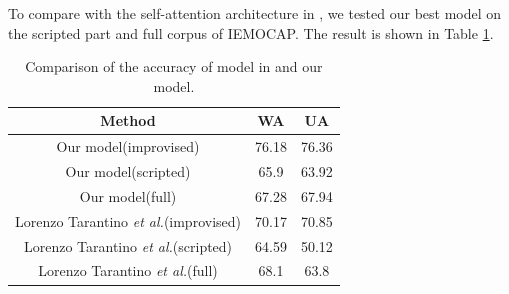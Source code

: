 \documentclass[10pt, conference, compsocconf]{IEEEtran}
\begin{document}
To compare with the self-attention architecture in \cite{tarantino2019self}, we tested our best model on the scripted part and full corpus of IEMOCAP. The result is shown in Table \ref{ScriptAndAll}.

\begin{table}[h]
	\renewcommand\arraystretch{1.5}
	\setlength{\abovecaptionskip}{-0.2cm}
	\caption{Comparison of the accuracy of model in \cite{tarantino2019self} and our model.}
	\label{ScriptAndAll}
	\begin{center}  
		\begin{tabular}{|c|c|c|} 
			\hline  
			Method & WA & UA\\   
			\hline  
			Our model(improvised) & 76.18 & 76.36 \\   
			\hline
			Our model(scripted) & 65.9 & 63.92 \\   			
			\hline
			Our model(full) & 67.28 & 67.94 \\   
			\hline
			Lorenzo Tarantino \emph{et al.}\cite{tarantino2019self}(improvised) & 70.17 & 70.85 \\   
			\hline
			Lorenzo Tarantino \emph{et al.}\cite{tarantino2019self}(scripted) & 64.59 & 50.12 \\   
			\hline
			Lorenzo Tarantino \emph{et al.}\cite{tarantino2019self}(full) & 68.1 & 63.8 \\   
			\hline
		\end{tabular}  
	\end{center}  
\end{table}
\end{document}

